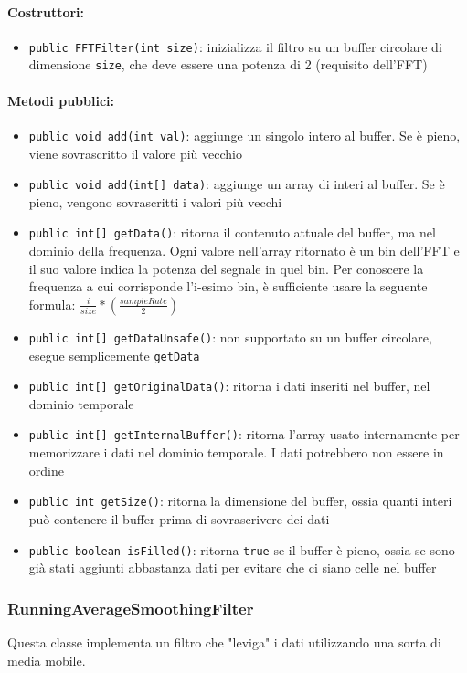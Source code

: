\paragraph{Costruttori:}\begin{itemize}
	\item \texttt{public FFTFilter(int size)}: inizializza il filtro su un buffer circolare di dimensione \texttt{size}, che deve essere una potenza di 2 (requisito dell'FFT)
\end{itemize}

\paragraph{Metodi pubblici:} \begin{itemize}
	\item \texttt{public void add(int val)}: aggiunge un singolo intero al buffer. Se è pieno, viene sovrascritto il valore più vecchio
	\item \texttt{public void add(int[] data)}: aggiunge un array di interi al buffer. Se è pieno, vengono sovrascritti i valori più vecchi
	\item \texttt{public int[] getData()}: ritorna il contenuto attuale del buffer, ma nel dominio della frequenza. Ogni valore nell'array ritornato è un bin dell'FFT e il suo valore indica la potenza del segnale in quel bin. Per conoscere la frequenza a cui corrisponde l'i-esimo bin, è sufficiente usare la seguente formula: $\frac{i}{size}*(\frac{sampleRate}{2})$
	\item \texttt{public int[] getDataUnsafe()}: non supportato su un buffer circolare, esegue semplicemente \texttt{getData}
	\item \texttt{public int[] getOriginalData()}: ritorna i dati inseriti nel buffer, nel dominio temporale
	\item \texttt{public int[] getInternalBuffer()}: ritorna l'array usato internamente per memorizzare i dati nel dominio temporale. I dati potrebbero non essere in ordine
	\item \texttt{public int getSize()}: ritorna la dimensione del buffer, ossia quanti interi può contenere il buffer prima di sovrascrivere dei dati
	\item \texttt{public boolean isFilled()}: ritorna \texttt{true} se il buffer è pieno, ossia se sono già stati aggiunti abbastanza dati per evitare che ci siano celle nel buffer
\end{itemize}

\subsubsection{RunningAverageSmoothingFilter}
Questa classe implementa un filtro che "leviga" i dati utilizzando una sorta di media mobile.

